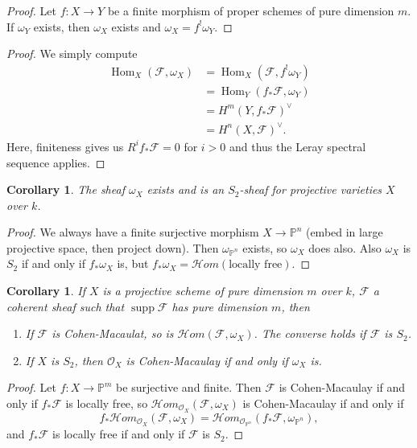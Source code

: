 \documentclass[leqno, openany]{memoir}
\newtheorem{cor}[thm]{Corollary}
\theoremstyle{definition}
\theoremstyle{remark}
\theoremstyle{plain}
\theoremstyle{definition}
\theoremstyle{remark}
\renewcommand{\P}{\mathbb{P}}
\newcommand{\mc}[1]{\mathcal{#1}}
\DeclareMathOperator{\Hom}{Hom}
\DeclareMathOperator{\supp}{supp}
\begin{document}
\begin{proof}
    Let $f \colon X \to Y$ be a finite morphism of proper schemes of pure dimension $m$. If $\omega_Y$ exists, then $\omega_X$ exists and $\omega_X = f^! \omega_Y$.
\end{proof}

\begin{proof}
    We simply compute
    \begin{align*}
        \Hom_X(\mc{F}, \omega_X) &= \Hom_X(\mc{F}, f^! \omega_Y) \\
                                  &= \Hom_Y(f_* \mc{F}, \omega_Y) \\
                                  &= { H^m(Y, f_* \mc{F}) }^{\vee} \\
                                  &= { H^n(X, \mc{F}) }^{\vee}.
    \end{align*}
    Here, finiteness gives us $R^i f_* \mc{F} = 0$ for $i > 0$ and thus the Leray spectral sequence applies.
\end{proof}

\begin{cor}
    The sheaf $\omega_X$ exists and is an $S_2$-sheaf for projective varieties $X$ over $k$.
\end{cor}

\begin{proof}
    We always have a finite surjective morphism $X \to \P^n$ (embed in large projective space, then project down). Then $\omega_{\P^n}$ exists, so $\omega_X$ does also. Also $\omega_X$ is $S_2$ if and only if $f_* \omega_X$ is, but $f_* \omega_X = \mc{H}om(\text{locally free})$. 
\end{proof}

\begin{cor}
    If $X$ is a projective scheme of pure dimension $m$ over $k$, $\mc{F}$ a coherent sheaf such that $\supp \mc{F}$ has pure dimension $m$, then
    \begin{enumerate}
        \item If $\mc{F}$ is Cohen-Macaulat, so is $\mc{H}om(\mc{F}, \omega_X)$. The converse holds if $\mc{F}$ is $S_2$.
        \item If $X$ is $S_2$, then $\mc{O}_X$ is Cohen-Macaulay if and only if $\omega_X$ is.
    \end{enumerate}
\end{cor}

\begin{proof}
    Let $f \colon X \to \P^m$ be surjective and finite. Then $\mc{F}$ is Cohen-Macaulay if and only if $f_* \mc{F}$ is locally free, so $\mc{H}om_{\mc{O}_X}(\mc{F}, \omega_X)$ is Cohen-Macaulay if and only if
    \[ f_* \mc{H}om_{\mc{O}_X} (\mc{F}, \omega_X) = \mc{H}om_{\mc{O}_{\P^n}}(f_* \mc{F}, \omega_{\P^n}), \]
    and $f_* \mc{F}$ is locally free if and only if $\mc{F}$ is $S_2$.
\end{proof}
\end{document}
